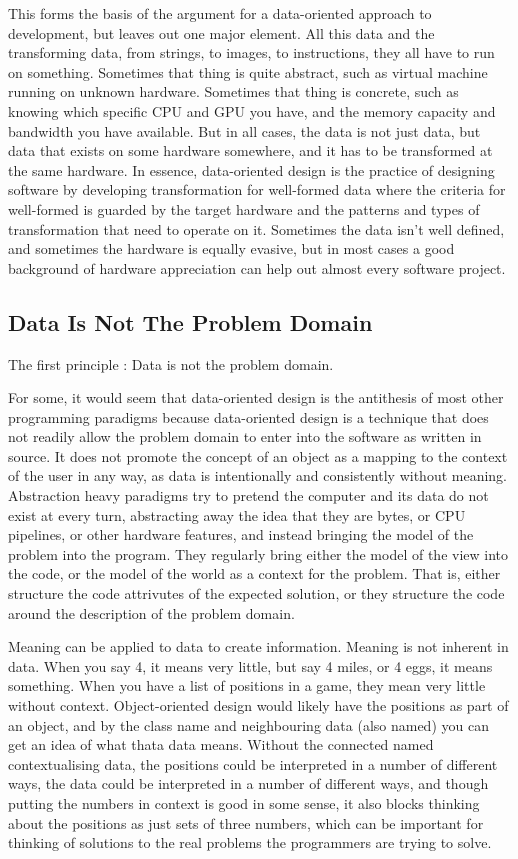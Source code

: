 \documentclass[a4paper,12pt]{article}
\begin{document}
This forms the basis of the argument for a data-oriented approach to development, but leaves out one major element.
All this data and the transforming data, from strings, to images, to instructions, they all have to run on something.
Sometimes that thing is quite abstract, such as virtual machine running on unknown hardware.
Sometimes that thing is concrete, such as knowing which specific CPU and GPU you have, and the memory capacity and bandwidth you have available.
But in all cases, the data is not just data, but data that exists on some hardware somewhere, and it has to be transformed at the same hardware.
In essence, data-oriented design is the practice of designing software by developing transformation for well-formed data where the criteria for well-formed is guarded by the target hardware and the patterns and types of transformation that need to operate on it.
Sometimes the data isn't well defined, and sometimes the hardware is equally evasive, but in most cases a good background of hardware appreciation can help out almost every software project.

\subsection{Data Is Not The Problem Domain}

The first principle : Data is not the problem domain.

For some, it would seem that data-oriented design is the antithesis of most other programming paradigms because data-oriented design is a technique that does not readily allow the problem domain to enter into the software as written in source.
It does not promote the concept of an object as a mapping to the context of the user in any way, as data is intentionally and consistently without meaning.
Abstraction heavy paradigms try to pretend the computer and its data do not exist at every turn, abstracting away the idea that they are bytes, or CPU pipelines, or other hardware features, and instead bringing the model of the problem into the program.
They regularly bring either the model of the view into the code, or the model of the world as a context for the problem.
That is, either structure the code attrivutes of the expected solution, or they structure the code around the description of the problem domain.

Meaning can be applied to data to create information.
Meaning is not inherent in data.
When you say 4, it means very little, but say 4 miles, or 4 eggs, it means something.
When you have a list of positions in a game, they mean very little without context. Object-oriented design would likely have the positions as part of an object, and by the class name and neighbouring data (also named) you can get an idea of what thata data means.
Without the connected named contextualising data, the positions could be interpreted in a number of different ways, the data could be interpreted in a number of different ways, and though putting the numbers in context is good in some sense, it also blocks thinking about the positions as just sets of three numbers, which can be important for thinking of solutions to the real problems the programmers are trying to solve.
\end{document}
